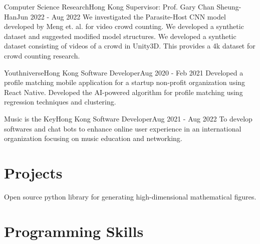 \documentclass[letterpaper, 11pt]{article}
\begin{document}
    \resumeSubheading
        {Computer Science Research}{Hong Kong}
        {Supervisor: Prof. Gary Chan Sheung-Han}{Jun 2022 - Aug 2022}
        \resumeItemListStart
                {We investigated the Parasite-Host CNN model developed by Meng et. al. for video crowd counting. We developed a synthetic dataset and suggested modified model structures.}
                {We developed a synthetic dataset consisting of videos of a crowd in Unity3D. This provides a 4k dataset for crowd counting research.}
        \resumeItemListEnd


    \resumeSubheading
        {Youthniverse}{Hong Kong}
        {Software Developer}{Aug 2020 - Feb 2021}
        \resumeItemListStart
                {Developed a profile matching mobile application for a startup non-profit organization using React Native.}
                {Developed the AI-powered algorithm for profile matching using regression techniques and clustering.}
        \resumeItemListEnd

    \resumeSubheading
        {Music is the Key}{Hong Kong}
        {Software Developer}{Aug 2021 - Aug 2022}
        \resumeItemListStart
                {To develop softwares and chat bots to enhance online user experience in an international organization focusing on music education and networking.}
        \resumeItemListEnd
\resumeSubHeadingListEnd


\section{Projects}
\resumeSubHeadingListStart
        {Open source python library for generating high-dimensional mathematical figures.}
\resumeSubHeadingListEnd

%
\section{Programming Skills}
\resumeSubHeadingListStart
\resumeSubHeadingListEnd


\end{document}
